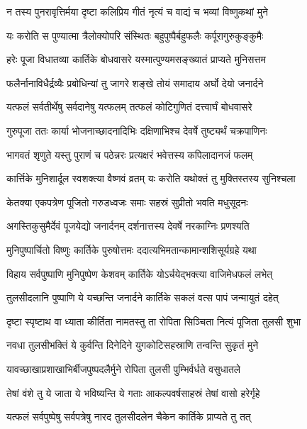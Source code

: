 \twolineshloka
{न तस्य पुनरावृत्तिर्मया दृष्टा कलिप्रिय}
{गीतं नृत्यं च वाद्यं च भव्यां विष्णुकथां मुने}%

\twolineshloka
{यः करोति स पुण्यात्मा त्रैलोक्योपरि संस्थितः}
{बहुपुष्पैर्बहुफलैः कर्पूरागुरुकुङ्कुमैः}%

\twolineshloka
{हरेः पूजा विधातव्या कार्तिके बोधवासरे}
{यस्मात्पुण्यमसङ्ख्यातं प्राप्यते मुनिसत्तम}%

\twolineshloka
{फलैर्नानाविधैर्द्रव्यैः प्रबोधिन्यां तु जागरे}
{शङ्खे तोयं समादाय अर्घो देयो जनार्दने}%

\twolineshloka
{यत्फलं सर्वतीर्थेषु सर्वदानेषु यत्फलम्}
{तत्फलं कोटिगुणितं दत्त्वार्घं बोधवासरे}%

\twolineshloka
{गुरुपूजा ततः कार्या भोजनाच्छादनादिभिः}
{दक्षिणाभिश्च देवर्षे तुष्ट्यर्थं चक्रपाणिनः}%

\twolineshloka
{भागवतं शृणुते यस्तु पुराणं च पठेन्नरः}
{प्रत्यक्षरं भवेत्तस्य कपिलादानजं फलम्}%

\twolineshloka
{कार्त्तिके मुनिशार्दूल स्वशक्त्या वैष्णवं व्रतम्}
{यः करोति यथोक्तं तु मुक्तिस्तस्य सुनिश्चला}%

\twolineshloka
{केतक्या एकपत्रेण पूजितो गरुडध्वजः}
{समाः सहस्रं सुप्रीतो भवति मधुसूदनः}%

\twolineshloka
{अगस्तिकुसुमैर्देवं पूजयेद्यो जनार्दनम्}
{दर्शनात्तस्य देवर्षे नरकाग्निः प्रणश्यति}%

\twolineshloka
{मुनिपुष्पार्चितो विष्णुः कार्तिके पुरुषोत्तमः}
{ददात्यभिमतान्कामान्शशिसूर्यग्रहे यथा}%

\twolineshloka
{विहाय सर्वपुष्पाणि मुनिपुष्पेण केशवम्}
{कार्तिके योऽर्चयेद्भक्त्या वाजिमेधफलं लभेत्}%

\twolineshloka
{तुलसीदलानि पुष्पाणि ये यच्छन्ति जनार्दने}
{कार्तिके सकलं वत्स पापं जन्मायुतं दहेत्}%

\twolineshloka
{दृष्टा स्पृष्टाथ वा ध्याता कीर्तिता नामतस्तु ता}
{रोपिता सिञ्चिता नित्यं पूजिता तुलसी शुभा}%

\twolineshloka
{नवधा तुलसीभक्तिं ये कुर्वन्ति दिनेदिने}
{युगकोटिसहस्राणि तन्वन्ति सुकृतं मुने}%

\twolineshloka
{यावच्छाखाप्रशाखाभिर्बीजपुष्पदलैर्मुने}
{रोपिता तुलसी पुम्भिर्वर्धते वसुधातले}%

\twolineshloka
{तेषां वंशे तु ये जाता ये भविष्यन्ति ये गताः}
{आकल्पवर्षसाहस्रं तेषां वासो हरेर्गृहे}%

\twolineshloka
{यत्फलं सर्वपुष्पेषु सर्वपत्रेषु नारद}
{तुलसीदलेन चैकेन कार्तिके प्राप्यते तु तत्}%


